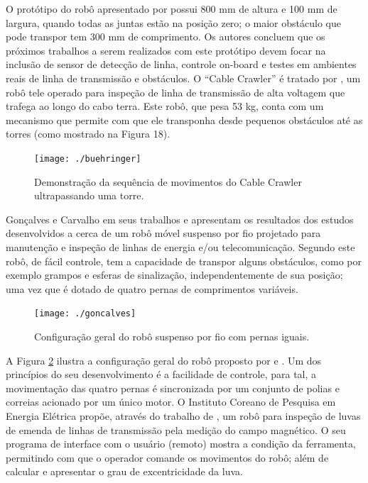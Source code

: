 O protótipo do robô apresentado por  possui 800 mm de altura e 100 mm de largura, quando todas as juntas estão na posição zero; o maior obstáculo que pode transpor tem 300 mm de comprimento. Os autores concluem que os próximos trabalhos a serem realizados com este protótipo devem focar na inclusão de sensor de detecção de linha, controle on-board e testes em ambientes reais de linha de transmissão e obstáculos.  
O “Cable Crawler” é tratado por , um robô tele operado para inspeção de linha de transmissão de alta voltagem que trafega ao longo do cabo terra. Este robô, que pesa 53 kg, conta com um mecanismo que permite com que ele transponha desde pequenos obstáculos até as torres (como mostrado na Figura 18). 

\begin{figure} [h!]	
	\caption{Demonstração da sequência de movimentos do Cable Crawler ultrapassando uma torre.}
	\label{img:buehringer}											 
	\centering													 
	\texttt{[image: ./buehringer]}
\end{figure}													 

Gonçalves e Carvalho em seus trabalhos \cite{goncalves2010graphical} e \cite{gonccalves2013review}  apresentam os resultados dos estudos desenvolvidos a cerca de um robô móvel suspenso por fio projetado para manutenção e inspeção de linhas de energia e/ou telecomunicação. Segundo  este robô, de fácil controle, tem a capacidade de transpor alguns obstáculos, como por exemplo grampos e esferas de sinalização, independentemente de sua posição; uma vez que é dotado de quatro pernas de comprimentos variáveis.

\begin{figure} [h!]	
	\caption{Configuração geral do robô suspenso por fio com pernas iguais.}
	\label{img:goncalves}											 
	\centering													 
	\texttt{[image: ./goncalves]}
\end{figure}													 

A Figura \ref{img:goncalves} ilustra a configuração geral do robô proposto por  e . Um dos princípios do seu desenvolvimento é a  facilidade de controle, para tal, a movimentação das quatro pernas é sincronizada por um conjunto de polias e correias acionado por um único motor. 
O Instituto Coreano de Pesquisa em Energia Elétrica propõe, através do trabalho de , um robô para inspeção de luvas de emenda de linhas de transmissão pela medição do campo magnético. O seu programa de interface com o usuário (remoto) mostra a condição da ferramenta, permitindo com que o operador comande os movimentos do robô; além de calcular e apresentar o grau de excentricidade da luva.  

